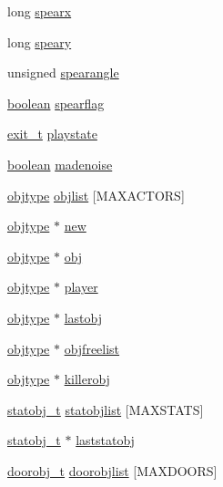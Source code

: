 \begin{DoxyCompactItemize}
\item 
long \hyperlink{WL__DEF_8H_a1ef14592c8e9de332d645be5e3374f4a}{spearx}
\item 
long \hyperlink{WL__DEF_8H_a01339fc6073a44a9034c4be0521b04f8}{speary}
\item 
unsigned \hyperlink{WL__DEF_8H_aeabd6653f233001b4ab39e050f68e50a}{spearangle}
\item 
\hyperlink{ID__HEAD_8H_a7c6368b321bd9acd0149b030bb8275ed}{boolean} \hyperlink{WL__DEF_8H_acb0002722dd184f6c0ed9e21d9d4f4f2}{spearflag}
\item 
\hyperlink{WL__DEF_8H_a1f5fa69e42ee452aa28c256fd25c33cf}{exit\_\-t} \hyperlink{WL__DEF_8H_a7bc9cfbaebb2f8731fc6a008d5e02bff}{playstate}
\item 
\hyperlink{ID__HEAD_8H_a7c6368b321bd9acd0149b030bb8275ed}{boolean} \hyperlink{WL__DEF_8H_a4971e2bca2f2589e2a6a70d6d6c54caa}{madenoise}
\item 
\hyperlink{structobjstruct}{objtype} \hyperlink{WL__DEF_8H_a6e9f072b148ef10ec86e297a493110f2}{objlist} \mbox{[}MAXACTORS\mbox{]}
\item 
\hyperlink{structobjstruct}{objtype} $\ast$ \hyperlink{WL__DEF_8H_aeef0824257f536812a114a0e932b654f}{new}
\item 
\hyperlink{structobjstruct}{objtype} $\ast$ \hyperlink{WL__DEF_8H_af2676bb450cb1b81beed4d6cb5038ac1}{obj}
\item 
\hyperlink{structobjstruct}{objtype} $\ast$ \hyperlink{WL__DEF_8H_aab35f908015a45224c5de99938b392f0}{player}
\item 
\hyperlink{structobjstruct}{objtype} $\ast$ \hyperlink{WL__DEF_8H_afcd8a7c0f5c40f4a956efc9b5c0f7eb7}{lastobj}
\item 
\hyperlink{structobjstruct}{objtype} $\ast$ \hyperlink{WL__DEF_8H_a0bbfafb17a6f027cbcd951f84a1bb2ee}{objfreelist}
\item 
\hyperlink{structobjstruct}{objtype} $\ast$ \hyperlink{WL__DEF_8H_a93feadbaf779c18179439f73f406a0d9}{killerobj}
\item 
\hyperlink{structstatstruct}{statobj\_\-t} \hyperlink{WL__DEF_8H_a64d166fbf5120795eaf1881a692b6360}{statobjlist} \mbox{[}MAXSTATS\mbox{]}
\item 
\hyperlink{structstatstruct}{statobj\_\-t} $\ast$ \hyperlink{WL__DEF_8H_a6797183a5cacdaf405abbbcb02881132}{laststatobj}
\item 
\hyperlink{structdoorstruct}{doorobj\_\-t} \hyperlink{WL__DEF_8H_a19ecae5aac787e9fb8bbc851164b1170}{doorobjlist} \mbox{[}MAXDOORS\mbox{]}
\item 

\end{DoxyCompactItemize}
